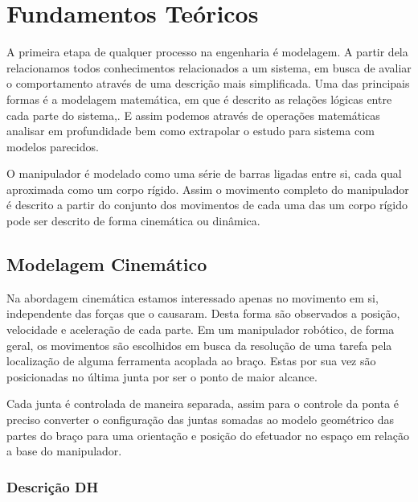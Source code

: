 \chapter{Fundamentos Teóricos}


\label{CapIntroTeory}


A primeira etapa de qualquer processo na engenharia é modelagem. A partir dela relacionamos todos conhecimentos relacionados a um sistema, em busca de avaliar o comportamento através de uma descrição mais simplificada. Uma das principais formas é a modelagem matemática, em que é descrito as relações lógicas entre cada parte do sistema,. E assim podemos através de operações matemáticas analisar em profundidade bem como extrapolar o estudo para sistema com modelos parecidos.

O manipulador é modelado como uma série de barras ligadas entre si, cada qual aproximada como um corpo rígido. Assim o movimento completo do manipulador é descrito a partir do conjunto dos movimentos de cada uma das  um corpo rígido pode ser descrito de forma cinemática ou dinâmica. 


\section{Modelagem Cinemático}

Na abordagem cinemática estamos interessado apenas no movimento em si, independente das forças que o causaram. Desta forma são observados a posição, velocidade e aceleração de cada parte. Em um manipulador robótico, de forma geral, os movimentos são escolhidos em busca da resolução de uma tarefa pela localização de alguma ferramenta acoplada ao braço. Estas por sua vez são posicionadas no última junta por ser o ponto de maior alcance.


Cada junta é controlada de maneira separada, assim para o controle da ponta é preciso converter o configuração das juntas somadas ao modelo geométrico das partes do braço para uma orientação e posição do efetuador no espaço em relação a base do manipulador.



\subsection{Descrição DH}

